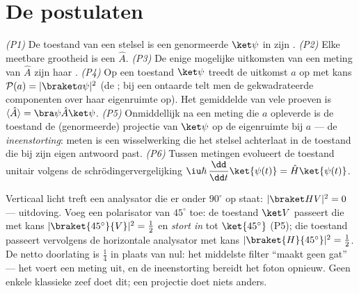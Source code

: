 \section{De postulaten}

\begin{theorem}\label{thm:b3:quantum-formalism:postulates}
\emph{(P1)} De toestand van een stelsel is een genormeerde  $\ket\psi$
in zijn .
\emph{(P2)} Elke meetbare grootheid is een  $\hat A$.
\emph{(P3)} De enige mogelijke uitkomsten van een meting van $\hat A$
zijn haar .
\emph{(P4)} Op een toestand $\ket\psi$ treedt de uitkomst $a$ op met kans
$\mathcal P(a) = |\braket a\psi|^2$ (de ; bij een ontaarde
 telt men de gekwadrateerde componenten over haar eigenruimte
op). Het gemiddelde van vele proeven is $\langle\hat A\rangle =
\bra\psi\hat A\ket\psi$.
\emph{(P5)} Onmiddellijk na een meting die $a$ opleverde is de toestand de
(genormeerde) projectie van $\ket\psi$ op de eigenruimte bij $a$ --- de
\emph{ineenstorting}: meten is een wisselwerking die het stelsel achterlaat
in de toestand die bij zijn eigen antwoord past.
\emph{(P6)} Tussen metingen evolueert de toestand unitair volgens de
schrödingervergelijking
$\iu\hbar\,\dfrac{\dd}{\dd t}\ket{\psi(t)} = \hat H\ket{\psi(t)}$.
\end{theorem}
\admitted

\begin{example}\label{ex:b3:quantum-formalism:threepolarizers}
Verticaal licht treft een analysator die er onder $90^\circ$ op staat:
$|\braket
HV|^2 = 0$ --- uitdoving. Voeg een polarisator van $45^\circ$
toe: de toestand $\ket V$ passeert die met kans
$|\braket{45^\circ}{V}|^2 =
\tfrac12$ en \emph{stort in} tot
$\ket{45^\circ}$ (P5); die toestand passeert vervolgens de horizontale
analysator met kans $|\braket{H}{45^\circ}|^2 = \tfrac12$. De netto
doorlating is $\tfrac14$ in plaats van nul: het middelste filter ``maakt
geen gat'' --- het voert een meting uit, en de ineenstorting bereidt het
foton opnieuw. Geen enkele klassieke zeef doet dit; een projectie doet
niets anders.
\end{example}

